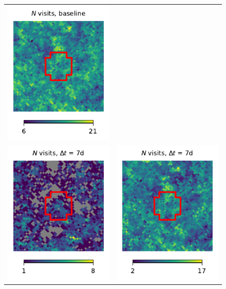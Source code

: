 \documentclass[preprintm,linenumbers]{aastex631}
\begin{document}
\begin{figure}
\begin{tabular}{@{}c@{}c@{}}
				\includegraphics{results/skymaps_cutout/skymaps_cutout_first_year_one_snap_v4_0_10yrs_db_noDD_noTwi_nside-256_CountMetric_r_WFD_noDD_noTwi.pdf} \\
				\includegraphics{results/skymaps_cutout/skymaps_cutout_first_year_one_snap_v4_0_10yrs_db_noDD_noTwi_tscale-7_nside-256_doAllTemplateMetrics_reduceCount_r_NES_noDD_noTwi.pdf} &
				\includegraphics{results/skymaps_cutout/skymaps_cutout_first_year_one_snap_v4_0_10yrs_db_noDD_noTwi_tscale-7_nside-256_doAllTemplateMetrics_reduceCount_r_WFD_noDD_noTwi.pdf} \\

\end{tabular}
\end{figure}
\end{document}
